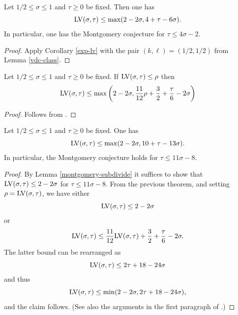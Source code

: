 \begin{theorem}\label{huxley-lv}\cite[Equation~(2.9)]{Huxley} Let $1/2 \leq \sigma \leq 1$ and $\tau \geq 0$ be fixed.  Then one has
    $$ \mathrm{LV}(\sigma,\tau) \leq \max( 2-2\sigma, 4 + \tau - 6 \sigma).$$
    In particular, one has the Montgomery conjecture for $\tau \leq 4 \sigma - 2$.
\end{theorem}

\literature
{}

\begin{proof}  Apply Corollary \ref{exp-lv} with the pair $(k,\ell) = (1/2,1/2)$ from Lemma \ref{vdc-class}.
\end{proof}


\begin{theorem}\label{heath_brown-lv-prelim} Let $1/2 \leq \sigma \leq 1$ and $\tau \geq 0$ be fixed.  If $\mathrm{LV}(\sigma, \tau) \le \rho$ then
    \[
    \mathrm{LV}(\sigma, \tau) \le \max\left(2 - 2\sigma, \frac{11}{12}\rho + \frac{3}{2} + \frac{\tau}{6} - 2\sigma\right)
    \]
\end{theorem}

\begin{proof}
    Follows from \cite[Lemma~1]{heathbrown_zero_1979}.
\end{proof}

\begin{theorem}\label{hb-opt} Let $1/2 \leq \sigma \leq 1$ and $\tau \geq 0$ be fixed.   One has
    $$ \mathrm{LV}(\sigma,\tau) \leq \max( 2-2\sigma, 10 + \tau - 13 \sigma).$$
In particular, the Montgomery conjecture holds for $\tau \leq 11 \sigma - 8$.
\end{theorem}


\literature
{}

\begin{proof}  By Lemma \ref{montgomery-subdivide} it suffices to show that $\mathrm{LV}(\sigma,\tau) \leq 2-2\sigma$ for $\tau \leq 11\sigma-8$.  From the previous theorem, and setting $\rho = \mathrm{LV}(\sigma,\tau)$, we have either
$$ \mathrm{LV}(\sigma,\tau) \leq 2-2\sigma$$
or
$$ \mathrm{LV}(\sigma,\tau) \leq \frac{11}{12}\mathrm{LV}(\sigma,\tau) + \frac{3}{2} + \frac{\tau}{6} - 2\sigma.$$
The latter bound can be rearranged as
$$ \mathrm{LV}(\sigma,\tau) \leq 2\tau + 18 - 24\sigma$$
and thus
$$ \mathrm{LV}(\sigma,\tau) \leq \min( 2-2\sigma, 2\tau + 18 - 24\sigma),$$
and the claim follows.  (See also the arguments in the first paragraph of \cite[p. 226]{heathbrown_zero_1979}.)
\end{proof}


